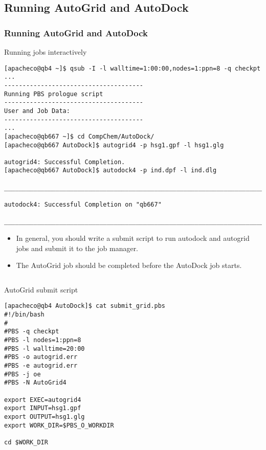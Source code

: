 \documentclass[slidestop,mathserif,compress,xcolor=svgnames]{beamer}
\newenvironment{eblock}[0]
{
\begin{beamerboxesrounded}[upper=uppercol2,lower=lowercol2,shadow=true]}
{\end{beamerboxesrounded}}
\begin{document}
\subsection{Running AutoGrid and AutoDock}
\begin{frame}
  \frametitle{\small Running AutoGrid and AutoDock}
  \begin{eblock}{Running jobs interactively}
    {\tiny
    \begin{verbatim}
[apacheco@qb4 ~]$ qsub -I -l walltime=1:00:00,nodes=1:ppn=8 -q checkpt
...
--------------------------------------
Running PBS prologue script
--------------------------------------
User and Job Data:
--------------------------------------
...
[apacheco@qb667 ~]$ cd CompChem/AutoDock/
[apacheco@qb667 AutoDock]$ autogrid4 -p hsg1.gpf -l hsg1.glg

autogrid4: Successful Completion.
[apacheco@qb667 AutoDock]$ autodock4 -p ind.dpf -l ind.dlg

________________________________________________________________________________

autodock4: Successful Completion on "qb667"

________________________________________________________________________________

    \end{verbatim}
    }
  \end{eblock}
  \begin{block}{}
    \begin{itemize}
      \item In general, you should write a submit script to run autodock and autogrid jobs and submit it to the job manager.
      \item The AutoGrid job should be completed before the AutoDock job starts.
    \end{itemize}
  \end{block}
  \begin{columns}
    \column{5.6cm}
    \begin{eblock}{AutoGrid submit script}
      {\tiny
      \begin{verbatim}
[apacheco@qb4 AutoDock]$ cat submit_grid.pbs
#!/bin/bash
#
#PBS -q checkpt
#PBS -l nodes=1:ppn=8
#PBS -l walltime=20:00
#PBS -o autogrid.err
#PBS -e autogrid.err
#PBS -j oe
#PBS -N AutoGrid4

export EXEC=autogrid4
export INPUT=hsg1.gpf
export OUTPUT=hsg1.glg
export WORK_DIR=$PBS_O_WORKDIR

cd $WORK_DIR


\end{verbatim}}
\end{eblock}
\end{columns}
\end{frame}
\end{document}
